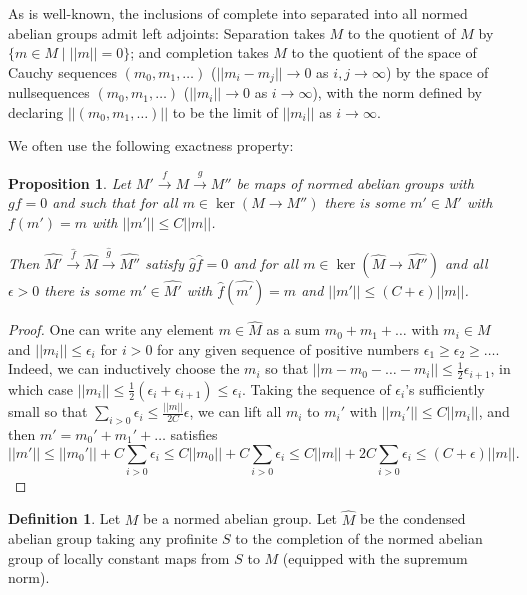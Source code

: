 \documentclass[11pt]{amsbook}
\numberwithin{equation}{section}
\numberwithin{theorem}{section}
\newtheorem{proposition}[theorem]{Proposition}
\theoremstyle{definition}
\newtheorem{definition}[theorem]{Definition}
\begin{document}
As is well-known, the inclusions of complete into separated into all normed abelian groups admit left adjoints: Separation takes $M$ to the quotient of $M$ by $\{m\in M\mid ||m||=0\}$; and completion takes $M$ to the quotient of the space of Cauchy sequences $(m_0,m_1,\ldots)$ ($||m_i-m_j||\to 0$ as $i,j\to \infty$) by the space of nullsequences $(m_0,m_1,\ldots)$ ($||m_i||\to 0$ as $i\to \infty$), with the norm defined by declaring $||(m_0,m_1,\ldots)||$ to be the limit of $||m_i||$ as $i\to \infty$.

We often use the following exactness property:

\begin{proposition}\label{prop:completeexact} Let $M'\xrightarrow{f} M\xrightarrow{g} M''$ be maps of normed abelian groups with $gf=0$ and such that for all $m\in \ker(M\to M'')$ there is some $m'\in M'$ with $f(m')=m$ with $||m'||\leq C||m||$.

Then $\widehat{M'}\xrightarrow{\widehat{f}} \widehat{M}\xrightarrow{\widehat{g}} \widehat{M''}$ satisfy $\widehat{g}\widehat{f}=0$ and for all $m\in \ker(\widehat{M}\to \widehat{M''})$ and all $\epsilon>0$ there is some $m'\in \widehat{M'}$ with $\widehat{f}(\widehat{m'})=\widehat{m}$ and $||m'||\leq (C+\epsilon)||m||$.
\end{proposition}

\begin{proof} One can write any element $m\in \widehat{M}$ as a sum $m_0+m_1+\ldots$ with $m_i\in M$ and $||m_i||\leq \epsilon_i$ for $i>0$ for any given sequence of positive numbers $\epsilon_1\geq \epsilon_2\geq \ldots$. Indeed, we can inductively choose the $m_i$ so that $||m-m_0-\ldots-m_i||\leq \tfrac 12 \epsilon_{i+1}$, in which case $||m_i||\leq \tfrac 12(\epsilon_i+\epsilon_{i+1})\leq \epsilon_i$. Taking the sequence of $\epsilon_i$'s sufficiently small so that $\sum_{i>0} \epsilon_i\leq \tfrac {||m||}{2C} \epsilon$, we can lift all $m_i$ to $m_i'$ with $||m_i'||\leq C||m_i||$, and then $m'=m_0'+m_1'+\ldots$ satisfies
\[
||m'||\leq ||m_0'||+C\sum_{i>0} \epsilon_i\leq C||m_0||+C\sum_{i>0} \epsilon_i\leq C||m||+2C\sum_{i>0} \epsilon_i\leq (C+\epsilon)||m||.
\]
\end{proof}

\begin{definition} Let $M$ be a normed abelian group. Let $\widehat{M}$ be the condensed abelian group taking any profinite $S$ to the completion of the normed abelian group of locally constant maps from $S$ to $M$ (equipped with the supremum norm).
\end{definition}
\end{document}
